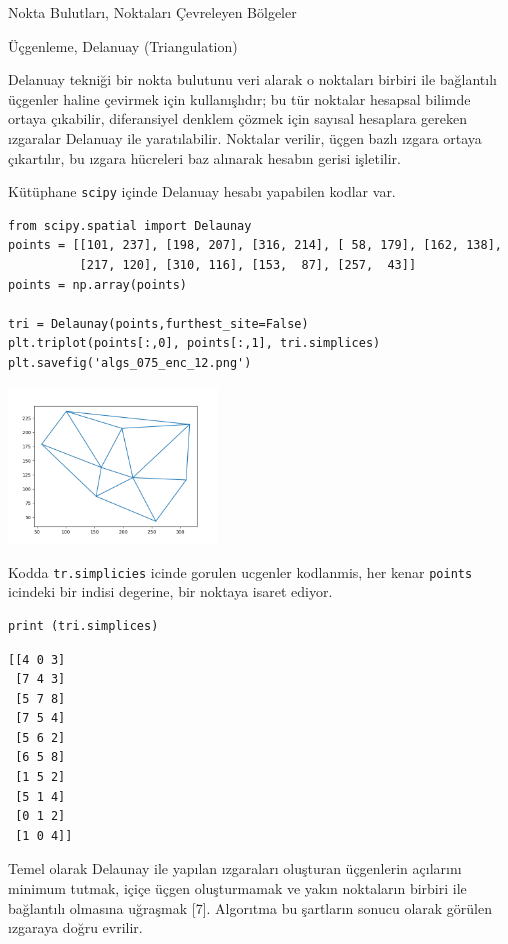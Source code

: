 \documentclass[12pt,fleqn]{article}\usepackage{../../common}
\begin{document}
Nokta Bulutları, Noktaları Çevreleyen Bölgeler

Üçgenleme, Delanuay (Triangulation)

Delanuay tekniği bir nokta bulutunu veri alarak o noktaları birbiri ile
bağlantılı üçgenler haline çevirmek için kullanışlıdır; bu tür noktalar hesapsal
bilimde ortaya çıkabilir, diferansiyel denklem çözmek için sayısal hesaplara
gereken ızgaralar Delanuay ile yaratılabilir. Noktalar verilir, üçgen bazlı
ızgara ortaya çıkartılır, bu ızgara hücreleri baz alınarak hesabın gerisi
işletilir.

Kütüphane \verb!scipy! içinde Delanuay hesabı yapabilen kodlar var.

\begin{verbatim}
from scipy.spatial import Delaunay
points = [[101, 237], [198, 207], [316, 214], [ 58, 179], [162, 138], 
          [217, 120], [310, 116], [153,  87], [257,  43]]
points = np.array(points)

tri = Delaunay(points,furthest_site=False)
plt.triplot(points[:,0], points[:,1], tri.simplices)
plt.savefig('algs_075_enc_12.png')
\end{verbatim}

\includegraphics[width=15em]{algs_075_enc_12.png}

Kodda \verb!tr.simplicies! icinde gorulen ucgenler kodlanmis, her kenar
\verb!points! icindeki bir indisi degerine, bir noktaya isaret ediyor.

\begin{verbatim}
print (tri.simplices)
\end{verbatim}

\begin{verbatim}
[[4 0 3]
 [7 4 3]
 [5 7 8]
 [7 5 4]
 [5 6 2]
 [6 5 8]
 [1 5 2]
 [5 1 4]
 [0 1 2]
 [1 0 4]]
\end{verbatim}

Temel olarak Delaunay ile yapılan ızgaraları oluşturan üçgenlerin açılarını
minimum tutmak, içiçe üçgen oluşturmamak ve yakın noktaların birbiri ile
bağlantılı olmasına uğraşmak [7]. Algorıtma bu şartların sonucu olarak görülen
ızgaraya doğru evrilir.
\end{document}

